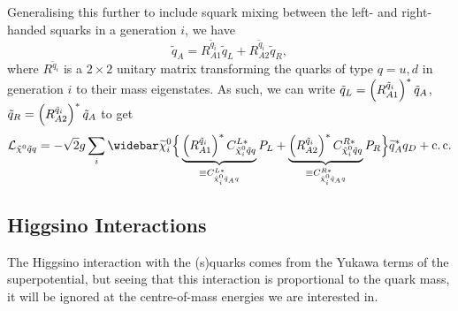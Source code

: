 \documentclass[../main.tex]{subfiles}
\begin{document}
\begin{donotread}
  Generalising this further to include squark mixing between the left- and
  right-handed squarks in a generation \(i\), we have
  \begin{equation}
    \tilde{q}_A = R_{A1}^{\tilde{q}_i} \tilde{q}_L + R_{A2}^{\tilde{q}_i} \tilde{q}_R,
  \end{equation}
  where \(R^{\tilde{q}_i}\) is a \(2\times 2\) unitary matrix transforming the quarks of type \(q = u, d\) in generation \(i\) to their mass eigenstates.
  As such, we can write \(\tilde{q}_L = \left(R^{\tilde{q}_i}_{A1}\right)^\ast \tilde{q}_A\), \(\tilde{q}_R = \left(R^{\tilde{q}_i}_{A2}\right)^\ast \tilde{q}_A\) to get
  \begin{equation}
    \label{susy:eq:nino_sqA_f_int}
    \L_{\tilde{\chi}^0 \tilde{q} q} = -\sqrt{2} g \sum_{i} \barnino[i] \Big\{ \underbrace{\pclosed{R^{\tilde{q}_i}_{A1}}^\ast C_{\tilde{\chi}^0_i \tilde{q} q}^{L\ast}}_{\equiv C_{\tilde{\chi}^0_i \tilde{q}_A q}^{L\ast}} P_L + \underbrace{\pclosed{R^{\tilde{q}_i}_{A2}}^\ast C_{\tilde{\chi}^0_i \tilde{q} q}^{R\ast}}_{\equiv C_{\tilde{\chi}^0_i \tilde{q}_A q}^{R\ast}} P_R \Big\} \wtilde{q}_A^\ast q_D + \cc
  \end{equation}

  \subsection{Higgsino Interactions}
  The Higgsino interaction with the (s)quarks comes from the Yukawa terms of the
  superpotential, but seeing that this interaction is proportional to the quark
  mass, it will be ignored at the centre-of-mass energies we are interested in.


\end{donotread}
\end{document}

